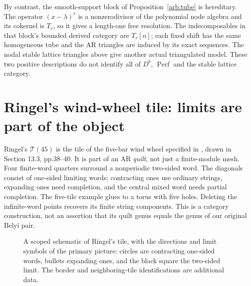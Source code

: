 \documentclass[11pt,oneside,openany]{book}
\theoremstyle{definition}\newtheorem{definition}[theorem]{Definition}
\theoremstyle{remark}\newtheorem{remark}[theorem]{Remark}
\begin{document}
By contrast, the smooth-support block of Proposition~\ref{arb:tube} is hereditary.
The operator $(x-\lambda)^r$ is a nonzerodivisor of the polynomial node algebra
and its cokernel is $T_r$, so it gives a length-one free resolution. The
indecomposables in that block's bounded derived category are $T_r[n]$; each
fixed shift has the same homogeneous tube and the AR triangles are induced
by its exact sequences. The nodal stable lattice triangles above give another
actual triangulated model. These two positive descriptions do not identify
all of $D^b$, $\operatorname{Perf}$ and the stable lattice category.

\section[Ringel's wind-wheel tile]{Ringel's wind-wheel tile: limits are part of the object}
Ringel's $\mathcal T(45)$ is the tile of the five-bar wind wheel specified in
\cite[Section 12.5, p.30]{ARBRingel}, drawn in Section 13.3, pp.38--40.
It is part of an AR \emph{quilt}, not just a finite-module mesh. Four finite-word
quarters surround a nonperiodic two-sided word. The diagonals consist of
one-sided limiting words; contracting ones use ordinary strings, expanding
ones need completion, and the central mixed word needs partial completion.
The five-tile example glues to a torus with five holes. Deleting the infinite-word
points recovers its finite string components. This is a category construction,
not an assertion that its quilt genus equals the genus of our original Belyi pair.

\begin{figure}[htbp]\centering
{}
\caption{A scoped schematic of Ringel's tile, with the directions and limit
symbols of the primary picture: circles are contracting one-sided words,
bullets expanding ones, and the black square the two-sided limit. The border
and neighboring-tile identifications are additional data.}
\end{figure}
\end{document}
